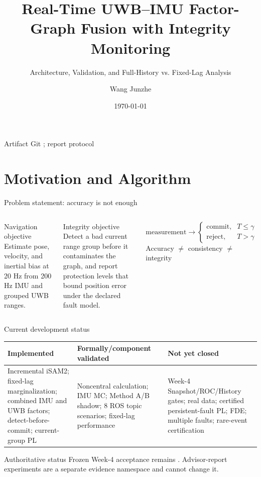 \documentclass[aspectratio=169,10pt]{beamer}
\title{Real-Time UWB--IMU Factor-Graph Fusion with Integrity Monitoring}
\subtitle{Architecture, Validation, and Full-History vs. Fixed-Lag Analysis}
\author{Wang Junzhe}
\date{\today}
\begin{document}
\begin{frame}
  \titlepage
  \vspace{-1em}
  \centering\scriptsize Artifact Git \texttt{\ArtifactGit}; report protocol \texttt{\ProtocolHash}
\end{frame}

\section{Motivation and Algorithm}
\begin{frame}{Problem statement: accuracy is not enough}
\begin{columns}[T]
\begin{block}{Navigation objective}
Estimate pose, velocity, and inertial bias at 20 Hz from 200 Hz IMU and grouped UWB ranges.
\end{block}
\begin{alertblock}{Integrity objective}
Detect a bad current range group before it contaminates the graph, and report protection levels that bound position error under the declared fault model.
\end{alertblock}
\[
\text{measurement}\rightarrow
\begin{cases}
\text{commit},&T\le\gamma\\
\text{reject},&T>\gamma
\end{cases}
\]
\vspace{.5em}
\centering Accuracy $\neq$ consistency $\neq$ integrity
\end{columns}
\end{frame}

\begin{frame}{Current development status}
\small
\begin{tabular}{p{}p{}p{}}
\toprule
Implemented & Formally/component validated & Not yet closed \\
\midrule
Incremental iSAM2; fixed-lag marginalization; combined IMU and UWB factors; detect-before-commit; current-group PL
& Noncentral calculation; IMU MC; Method A/B shadow; 8 ROS topic scenarios; fixed-lag performance
& Week-4 Snapshot/ROC/History gates; real data; certified persistent-fault PL; FDE; multiple faults; rare-event certification \\
\bottomrule
\end{tabular}
\vspace{.8em}
\begin{alertblock}{Authoritative status}
Frozen Week-4 acceptance remains \textbf{\WeekFourStatus}. Advisor-report experiments are a separate evidence namespace and cannot change it.
\end{alertblock}
\end{frame}
\end{document}

